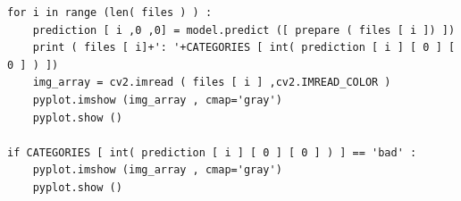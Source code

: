 \begin{lstlisting}
for i in range (len( files ) ) :
    prediction [ i ,0 ,0] = model.predict ([ prepare ( files [ i ]) ])
    print ( files [ i]+': '+CATEGORIES [ int( prediction [ i ] [ 0 ] [ 0 ] ) ])
    img_array = cv2.imread ( files [ i ] ,cv2.IMREAD_COLOR )
    pyplot.imshow (img_array , cmap='gray')
    pyplot.show ()

if CATEGORIES [ int( prediction [ i ] [ 0 ] [ 0 ] ) ] == 'bad' :
    pyplot.imshow (img_array , cmap='gray')
    pyplot.show ()
\end{lstlisting}

